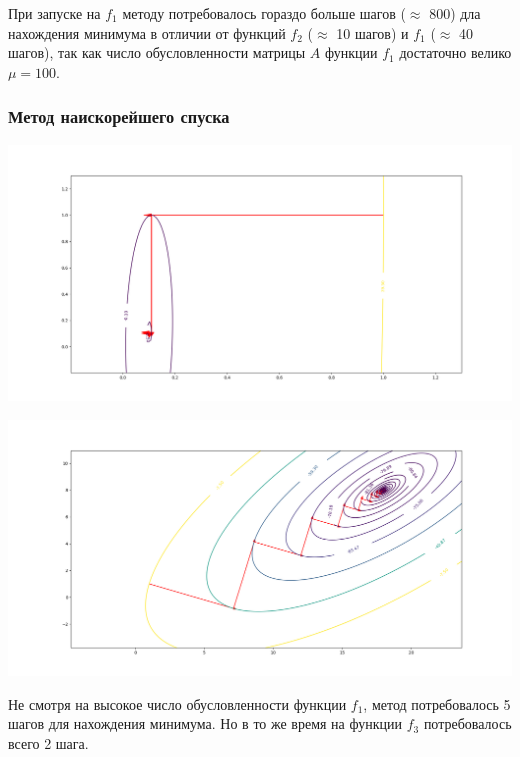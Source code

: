 \documentclass[english]{article}
\begin{document}
При запуске на \(f_1\) методу потребовалось гораздо больше шагов
(\(\approx\) 800) дла нахождения минимума в отличии от функций \(f_2\)
(\(\approx\) 10 шагов) и \(f_1\) (\(\approx\) 40 шагов), так как число
обусловленности матрицы \(A\) функции \(f_1\) достаточно велико \(\mu
= 100\).
\subsubsection{Метод наискорейшего спуска}
\begin{center}
    \includegraphics[scale=0.3]{plots/traectories/steepest_descent_1.png}
\end{center}
\begin{center}
    \includegraphics[scale=0.3]{plots/traectories/steepest_descent_3.png}
\end{center}

Не смотря на высокое число обусловленности функции \(f_1\), метод
потребовалось 5 шагов для нахождения минимума. Но в то же время на
функции \(f_3\) потребовалось всего 2 шага.
\end{document}
